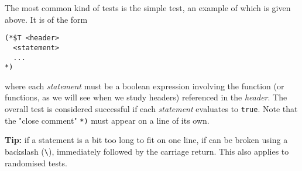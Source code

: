 
The most common kind of tests is the simple test, an example of which is given above. It
is of the form

\begin{verbatim}
(*$T <header>
  <statement>
  ...
*)
\end{verbatim}

where each \emph{statement} must be a boolean \OCaml{} expression involving the function (or
functions, as we will see when we study headers) referenced in the \emph{header}.
The overall test is considered successful if each \emph{statement} evaluates to \texttt{true}. Note
that the "close comment" \texttt{*)} must appear on a line of its own.

\textbf{Tip:} if a statement is a bit too long to fit on one line, if can be broken using a
backslash (\texttt{\backslash}), immediately followed by the carriage return. This also applies to
randomised tests.